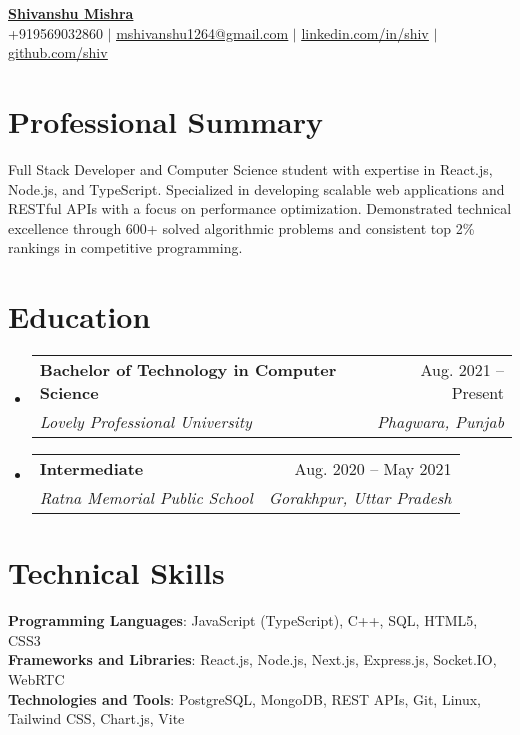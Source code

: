 \documentclass[letterpaper,11pt]{article}
\makeatletter
\newcommand{\resumeSubheading}[4]{
  \vspace{-2pt}\item
    \begin{tabular*}{0.97\textwidth}[t]{l@{\extracolsep{\fill}}r}
      \textbf{#1} & #2 \\
      \textit{\small#3} & \textit{\small #4} \\
    \end{tabular*}\vspace{-7pt}
}
\newcommand{\resumeSubHeadingListStart}{\begin{itemize}[leftmargin=0.15in, label={}]}
\newcommand{\resumeSubHeadingListEnd}{\end{itemize}}
\makeatother
\begin{document}
\begin{center}
	{\Huge \textbf{\href{https://shivanshuportf.netlify.app/}{Shivanshu Mishra}}} \\ \vspace{1pt}
	\small +919569032860 $|$ \href{mailto:mshivanshu1264@gmail.com}{\underline{mshivanshu1264@gmail.com}} $|$
	\href{https://linkedin.com/in/shivanshu-}{\underline{linkedin.com/in/shiv}} $|$
	\href{https://github.com/Ryomensukuna2003}{\underline{github.com/shiv}}
\end{center}

\section{Professional Summary}
\small{Full Stack Developer and Computer Science student with expertise in React.js, Node.js, and TypeScript. Specialized in developing scalable web applications and RESTful APIs with a focus on performance optimization. Demonstrated technical excellence through 600+ solved algorithmic problems and consistent top 2\% rankings in competitive programming.}

\section{Education}
\resumeSubHeadingListStart
\resumeSubheading
{Bachelor of Technology in Computer Science}{Aug. 2021 -- Present}
{Lovely Professional University}{Phagwara, Punjab}
\resumeSubheading
{Intermediate}{Aug. 2020 -- May 2021}
{Ratna Memorial Public School}{Gorakhpur, Uttar Pradesh}
\resumeSubHeadingListEnd

\section{Technical Skills}
\begin{itemize}[leftmargin=0.15in, label={}]
	\small{\item{
		            \textbf{Programming Languages}{: JavaScript (TypeScript), C++, SQL, HTML5, CSS3} \\
		            \textbf{Frameworks and Libraries}{: React.js, Node.js, Next.js, Express.js, Socket.IO, WebRTC} \\
		            \textbf{Technologies and Tools}{: PostgreSQL, MongoDB, REST APIs, Git, Linux, Tailwind CSS, Chart.js, Vite}
		      }}
\end{itemize}

\end{document}
